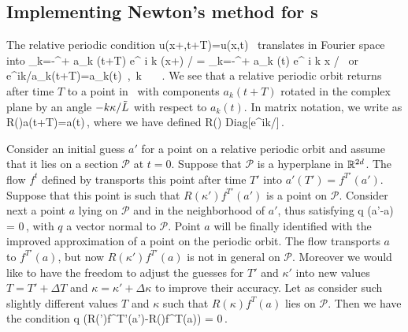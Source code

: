 \subsection{Implementing Newton's method  for \rpo s}
\label{sec:NewtRPOs}

The relative periodic condition
\beq
	u(x+\kappa,t+T)=u(x,t) \,
\eeq
translates in Fourier space into
\beq	
	\sum_{k=-\infty}^{+\infty} a_k (t+T) e^{ i k (x+\kappa) / \tildeL}
		= \sum_{k=-\infty}^{+\infty} a_k (t) e^{ i k x / \tildeL} \,
\eeq
or
\beq
	e^{ik\kappa/\tildeL}a_k(t+T)=a_k(t) \,,\ \forall k \in \integers
            \ \ \ .
	\label{eq:RPOcondition}
\eeq
We see that a relative periodic orbit returns after time $T$ to a point in
\statesp\ with components $a_k(t+T)$ rotated in the complex plane by an
angle $-k\kappa/\tilde{L}$ with respect to $a_k(t)$.
In matrix notation, we write  as
\beq
	R(\kappa)a(t+T)=a(t)\,,
	\label{eq:RPO}
\eeq
where we have defined
\beq
	R(\kappa) \equiv Diag[e^{ik\kappa/\tildeL}]\,.
\eeq

Consider an initial guess $a'$ for a point on a relative periodic orbit and assume that it lies on
a \Poincare section $\mathcal{P}$ at $t=0$. Suppose that $\mathcal{P}$ is a hyperplane in
$\mathbb{R}^{2d}$. The flow $f^t$ defined by  transports
this point after time $T'$ into $a'(T')=f^{T'}(a')$. Suppose that this point is such that $R(\kappa')f^{T'}(a')$
is a point on $\mathcal{P}$. Consider next a point $a$ lying on $\mathcal{P}$ and in the neighborhood of $a'$,
thus satisfying
\beq
	q \cdot (a'-a) = 0\,,
	\label{eq:cond a}
\eeq
with $q$ a vector normal to $\mathcal{P}$. Point $a$ will be finally identified with the improved
approximation of a point on the periodic orbit.
The flow transports $a$ to $f^{T'}(a)$, but now $R(\kappa')f^{T'}(a)$ is not in general on $\mathcal{P}$.
Moreover we would like to have the freedom to adjust the guesses for $T'$ and $\kappa'$ into new values
$T=T'+\Delta T$ and $\kappa=\kappa'+\Delta \kappa$ to improve their accuracy.
Let as consider such slightly different values $T$ and $\kappa$ such that $R(\kappa)f^{T}(a)$ lies on
$\mathcal{P}$. Then we have the condition
\beq
	q \cdot(R(\kappa')f^{T'}(a')-R(\kappa)f^{T}(a)) = 0\,.
	\label{eq:cond Rf(a)}
\eeq

